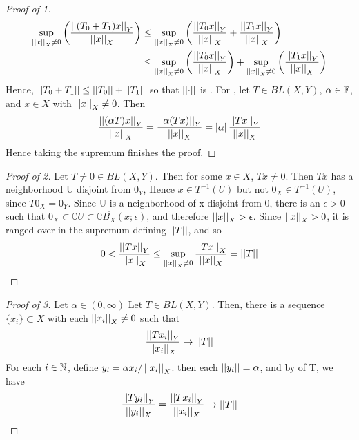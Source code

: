 \begin{prop}
\begin{proof}[Proof of 1]
    \begin{align*}
    \sup\limits_{\left|\left| x \right|\right|_X \neq 0} \left( \frac{\left|\left| (T_0+T_1)x \right|\right|_Y}{\left|\left| x \right|\right|_X}\right) & \leq\sup\limits_{\left|\left| x \right|\right|_X \neq 0} \left(  \frac{\left|\left| T_0x \right|\right|_Y}{\left|\left| x \right|\right|_X}+ \frac{\left|\left| T_1x \right|\right|_Y}{\left|\left| x \right|\right|_X}\right)\\
& \leq\sup\limits_{\left|\left| x \right|\right|_X \neq 0} \left(  \frac{\left|\left| T_0x \right|\right|_Y}{\left|\left| x \right|\right|_X}\right) + \sup\limits_{\left|\left| x \right|\right|_X \neq 0} \left( \frac{\left|\left| T_1x \right|\right|_Y}{\left|\left| x \right|\right|_X}\right)\\
    \end{align*}
    Hence, $\left|\left| T_0+T_1 \right|\right| \leq \left|\left| T_0 \right|\right|+\left|\left| T_1 \right|\right|$ so that $\left|\left| \cdot \right|\right|$ is \Subadditive. 
    For \AbsScalarHomogeneity, let $T \in BL(X,Y)$, $\alpha \in \mathbb{F}$, and $x \in X$ with $\left|\left| x \right|\right|_X \neq 0$. 
    Then 
    \begin{align*}
        \frac{\left|\left| (\alpha T)x \right|\right|_Y}{\left|\left| x \right|\right|_X} = \frac{\left|\left| \alpha (Tx) \right|\right|_Y}{\left|\left| x \right|\right|_X} = \left| \alpha \right| \frac{\left|\left| Tx \right|\right|_Y}{\left|\left| x \right|\right|_X}
    \end{align*}
    Hence taking the supremum finishes the proof.
\end{proof}
\begin{proof}[Proof of 2] 
   Let $T \neq 0 \in BL(X,Y)$. Then for some $x \in X$, $Tx \neq 0$. 
   Then $Tx$ has a neighborhood U disjoint from $0_Y$, 
   Hence $x \in T^{-1}(U)$ but not $0_X \in T^{-1}(U)$, since $T0_X = 0_Y$.
   Since U is a neighborhood of x disjoint from 0, 
   there is an $\epsilon > 0$ such that $0_X \subset \complement U \subset \complement \overline{B_X}(x;\epsilon)$,
   and therefore $\left|\left| x \right|\right|_X > \epsilon$. 
   Since $\left|\left| x \right|\right|_X > 0$, it is ranged over in the supremum defining $\left|\left| T \right|\right|$, and so
   \begin{equation}
   0 < \frac{\left|\left| Tx \right|\right|_Y}{\left|\left| x \right|\right|_X} \leq \sup\limits_{\left|\left| x \right|\right|_X \neq 0} \frac{\left|\left| Tx \right|\right|_X}{\left|\left| x \right|\right|_X}=\left|\left| T \right|\right|
   \end{equation}
\end{proof}
\begin{proof}[Proof of 3] 
    Let $\alpha \in (0,\infty)$
   Let $T \in BL(X,Y)$. 
   Then, there is a sequence $\{x_i\} \subset X$ with each $\left|\left| x_i \right|\right|_X \neq 0$ 
   such that 
   \begin{equation}
    \frac{\left|\left| Tx_i \right|\right|_Y}{\left|\left| x_i \right|\right|_X} \to \left|\left| T \right|\right|
    \end{equation}
    For each $i \in \mathbb{N}$, define $y_i =\alpha  x_i/\left|\left| x_i \right|\right|_X$. 
    then each $\left|\left| y_i \right|\right| = \alpha$, 
    and by \AbsScalarHomogeneity
    of T, we have 
    \begin{equation}
    \frac{\norm{Ty_i}_Y}{\norm{y_i}_X} = \frac{\norm{Tx_i}_Y}{\norm{x_i}_X} \to \norm{T}

\end{equation}
\end{proof}
\end{prop}
